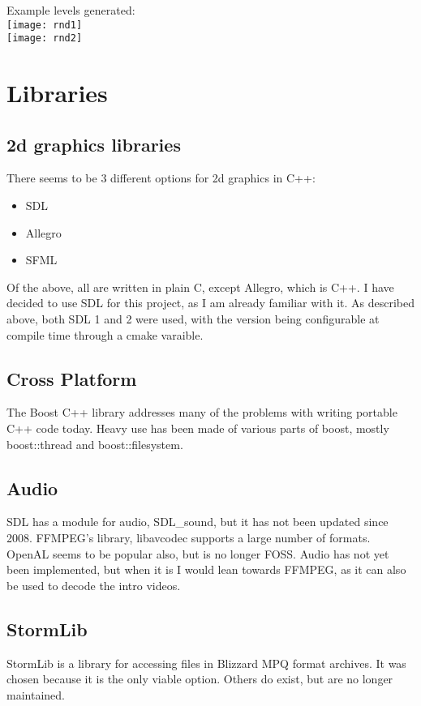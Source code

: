     Example levels generated:\\ 
    \texttt{[image: rnd1]}\\   
    \texttt{[image: rnd2]}\\
    
   	\newpage
    
   	\section{Libraries}
       	\subsection{2d graphics libraries}
    	There seems to be 3 different options for 2d graphics in C++:
    	\begin{itemize}
    	    \item{SDL}
    	    \item{Allegro}
    	    \item{SFML}
    	\end{itemize}
    	
    	Of the above, all are written in plain C, except Allegro, which is C++.
    	I have decided to use SDL for this project, as I am already familiar with it.
    	As described above, both SDL 1 and 2 were used, with the version being configurable at compile time through a cmake varaible.
    	
    	\subsection{Cross Platform}
        The Boost C++ library addresses many of the problems with writing portable C++ code today.
     	Heavy use has been made of various parts of boost, mostly boost::thread and boost::filesystem.
        
        \subsection{Audio}
        SDL has a module for audio, SDL\_sound\cite{sdls}, but it has not been updated since 2008.
        FFMPEG's library, libavcodec\cite{libavcodec} supports a large number of formats.
        OpenAL seems to be popular also, but is no longer FOSS.
        Audio has not yet been implemented, but when it is I would lean towards FFMPEG, as it can also be used to decode the intro videos.
        
        \subsection{StormLib}
        StormLib\cite{stormlib} is a library for accessing files in Blizzard MPQ format archives.
        It was chosen because it is the only viable option. Others do exist, but are no longer maintained.
